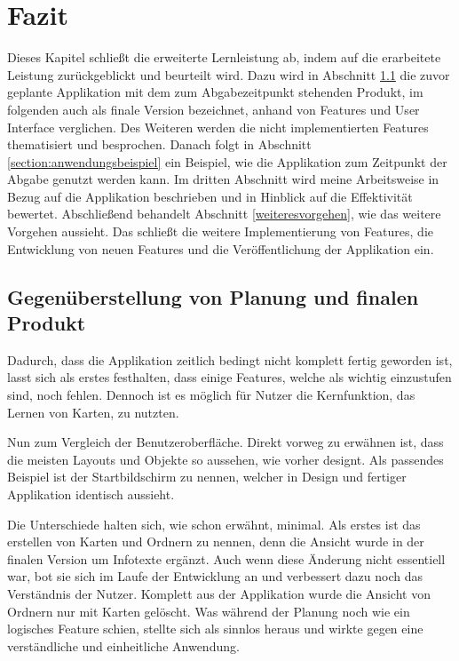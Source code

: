 \chapter{Fazit}
Dieses Kapitel schließt die erweiterte Lernleistung ab, indem auf die erarbeitete Leistung zurückgeblickt und beurteilt wird. Dazu wird in Abschnitt \ref{section:vergleich} die zuvor geplante Applikation mit dem zum Abgabezeitpunkt stehenden Produkt, im folgenden auch als finale Version bezeichnet, anhand von Features und User Interface verglichen. Des Weiteren werden die nicht implementierten Features thematisiert und besprochen. Danach folgt in Abschnitt \ref{section:anwendungsbeispiel} ein Beispiel, wie die Applikation zum Zeitpunkt der Abgabe genutzt werden kann. Im dritten Abschnitt wird meine Arbeitsweise in Bezug auf die Applikation beschrieben und in Hinblick auf die Effektivität bewertet. Abschließend behandelt Abschnitt \ref{weiteresvorgehen}, wie das weitere Vorgehen aussieht. Das schließt die weitere Implementierung von Features, die Entwicklung von neuen Features und die Veröffentlichung der Applikation ein.

\section{Gegenüberstellung von Planung und finalen Produkt}
\label{section:vergleich}

Dadurch, dass die Applikation zeitlich bedingt nicht komplett fertig geworden ist, lasst sich als erstes festhalten, dass einige Features, welche als wichtig einzustufen sind, noch fehlen. Dennoch ist es möglich für Nutzer die Kernfunktion, das Lernen von Karten, zu nutzten.

Nun zum Vergleich der Benutzeroberfläche. Direkt vorweg zu erwähnen ist, dass die meisten Layouts und Objekte so aussehen, wie vorher designt. Als passendes Beispiel ist der Startbildschirm zu nennen, welcher in Design und fertiger Applikation identisch aussieht.

Die Unterschiede halten sich, wie schon erwähnt, minimal. Als erstes ist das erstellen von Karten und Ordnern zu nennen, denn die Ansicht wurde in der finalen Version um Infotexte ergänzt. Auch wenn diese Änderung nicht essentiell war, bot sie sich im Laufe der Entwicklung an und verbessert dazu noch das Verständnis der Nutzer. Komplett aus der Applikation wurde die Ansicht von Ordnern nur mit Karten gelöscht. Was während der Planung noch wie ein logisches Feature schien, stellte sich als sinnlos heraus und wirkte gegen eine verständliche und einheitliche Anwendung.

